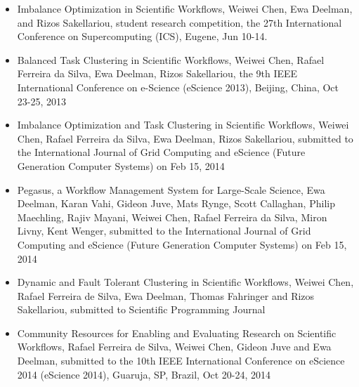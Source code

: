 \begin{itemize}
\item Imbalance Optimization in Scientific Workflows, Weiwei Chen, Ewa Deelman, and Rizos Sakellariou, student research competition, the 27th International Conference on Supercomputing (ICS), Eugene, Jun 10-14.

\item Balanced Task Clustering in Scientific Workflows, Weiwei Chen, Rafael Ferreira da Silva, Ewa Deelman, Rizos Sakellariou, the 9th IEEE International Conference on e-Science (eScience 2013), Beijing, China, Oct 23-25, 2013

\item Imbalance Optimization and Task Clustering in Scientific Workflows, Weiwei Chen, Rafael Ferreira da Silva, Ewa Deelman, Rizos Sakellariou, submitted to the International Journal of Grid Computing and eScience (Future Generation Computer Systems) on Feb 15, 2014

\item Pegasus, a Workflow Management System for Large-Scale Science, Ewa Deelman, Karan Vahi, Gideon Juve, Mats Rynge, Scott Callaghan, Philip Maechling, Rajiv Mayani, Weiwei Chen, Rafael Ferreira da Silva, Miron Livny, Kent Wenger, submitted to the International Journal of Grid Computing and eScience (Future Generation Computer Systems) on Feb 15, 2014

\item Dynamic and Fault Tolerant Clustering in Scientific Workflows, Weiwei Chen, Rafael Ferreira de Silva, Ewa Deelman, Thomas Fahringer and Rizos Sakellariou, submitted to Scientific Programming Journal 

\item Community Resources for Enabling and Evaluating Research on Scientific Workflows, Rafael Ferreira de Silva, Weiwei Chen, Gideon Juve and Ewa Deelman, submitted to the 10th IEEE International Conference on eScience 2014 (eScience 2014), Guaruja, SP, Brazil, Oct 20-24, 2014

\end{itemize}